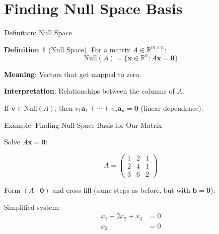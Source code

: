 \documentclass[10pt]{beamer}
\theoremstyle{definition}
\newtheorem{defi}{Definition}[section]
\newcommand{\x}[1]{\alert{\textbf{#1}}}
\begin{document}
\section{Finding Null Space Basis}

\begin{frame}{Definition: Null Space}

\begin{defi}[Null Space]
For a matrix $A \in \mathbb{R}^{m \times n}$:
$$\text{Null}(A) = \{\mathbf{x} \in \mathbb{R}^n : A\mathbf{x} = \mathbf{0}\}$$
\end{defi}

\vspace{1em}

\x{Meaning}: Vectors that get mapped to zero.

\vspace{1em}

\x{Interpretation}: Relationships between the columns of $A$.

\vspace{1em}

If $\mathbf{v} \in \text{Null}(A)$, then $v_1 \mathbf{a}_1 + \cdots + v_n \mathbf{a}_n = \mathbf{0}$ (linear dependence).

\end{frame}

\begin{frame}{Example: Finding Null Space Basis for Our Matrix}

Solve $A\mathbf{x} = \mathbf{0}$:

$$A = \begin{pmatrix} 1&2&1 \\ 2&4&1 \\ 3&6&2 \end{pmatrix}$$

\vspace{1em}

Form $(A \mid \mathbf{0})$ and cross-fill (same steps as before, but with $\mathbf{b} = \mathbf{0}$):

\vspace{0.5em}

Simplified system:
\begin{align*}
x_1 + 2x_2 + x_3 &= 0 \\
x_3 &= 0
\end{align*}

\end{frame}
\end{document}
